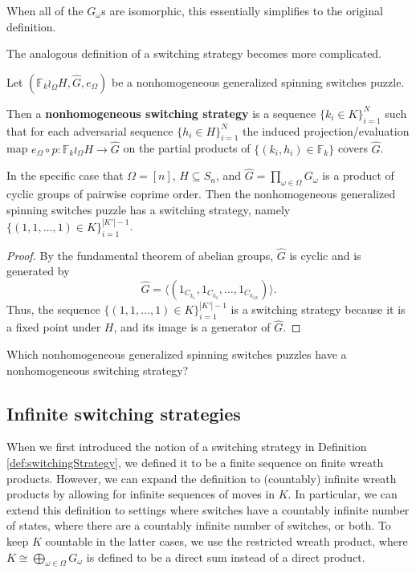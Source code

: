 When all of the $G_\omega$s are isomorphic, this essentially simplifies to the
original definition.

The analogous definition of a switching strategy becomes more complicated.

\begin{definition}
  Let $(\mathbb F_k \wr_\Omega H, \hat{G}, e_\Omega)$ be a nonhomogeneous
  generalized spinning switches puzzle.

  Then a \textbf{nonhomogeneous switching strategy} is a sequence
  $\{k_i \in K\}_{i=1}^{N}$
  such that for each adversarial sequence $\{h_i \in H\}_{i=1}^{N}$
  the induced projection/evaluation map
  $e_\Omega \circ p \colon \mathbb F_k \wr_\Omega H \rightarrow \hat{G}$
  on the partial products of $\{(k_i, h_i) \in \mathbb F_k\}$
  covers $\hat{G}$.
\end{definition}

\begin{proposition}
  In the specific case that $\Omega = [n]$, $H \subseteq S_n$, and
  $\hat{G} = \prod_{\omega \in \Omega} G_\omega$ is a product of cyclic groups of
  pairwise coprime order.
  Then the nonhomogeneous generalized spinning switches puzzle has a switching
  strategy, namely $\{(1,1,\dots,1) \in K\}_{i = 1}^{|K'| - 1}$.
\end{proposition}

\begin{proof}
  By the fundamental theorem of abelian groups, $\hat{G}$ is cyclic and is
  generated by \begin{equation}
    \hat{G} = \langle(1_{C_{k_1}}, 1_{C_{k_2}}, \dots, 1_{C_{k_{|\Omega|}}})\rangle.
  \end{equation}
  Thus, the sequence $\{(1,1,\dots,1) \in K\}_{i=1}^{|K'|-1}$ is a switching
  strategy because it is a fixed point under $H$, and its image is a generator
  of $\hat{G}$.
\end{proof}

\begin{openquestion}
  Which nonhomogeneous generalized spinning switches puzzles have
  a nonhomogeneous switching strategy?
\end{openquestion}

\subsection{Infinite switching strategies}
When we first introduced the notion of a switching strategy in
Definition \ref{def:switchingStrategy},
we defined it to be a finite sequence on finite wreath products.
However, we can expand the definition to (countably) infinite wreath products
by allowing for infinite sequences of moves in $K$.
In particular, we can extend this definition to settings where
switches have a countably infinite number of states,
where there are a countably infinite number of switches,
or both.
To keep $K$ countable in the latter cases,
we use the restricted wreath product, where
$K \cong \bigoplus_{\omega \in \Omega} G_\omega$ is defined to be a direct
sum instead of a direct product.

